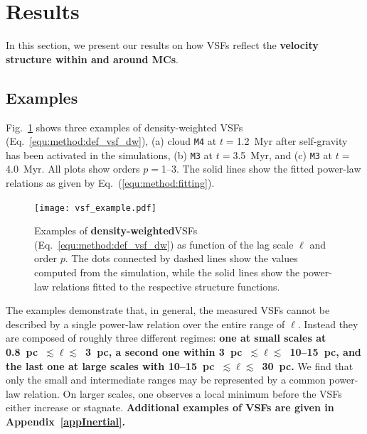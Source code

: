 \section{Results}\label{results}

In this section, we present our results on how VSFs reflect the \textbf{velocity structure within and around MCs}.

\subsection{Examples}\label{results:example}

Fig.~\ref{pic:results:vsf_example} shows three examples of density-weighted VSFs (Eq.~\ref{equ:method:def_vsf_dw}), (a) cloud \texttt{M4} at $t=$1.2~Myr after self-gravity has been activated in the simulations, (b) \texttt{M3} at $t=$3.5~Myr, and (c) \texttt{M3} at $t=$4.0~Myr.
All plots show orders $p=$1--3.
The solid lines show the fitted power-law relations as given by Eq.~(\ref{equ:method:fitting}).

\begin{figure}[!htb]
	\centering
	\texttt{[image: vsf\_example.pdf]}
	\caption{Examples of \textbf{density-weighted}VSFs (Eq.~\ref{equ:method:def_vsf_dw})  as function of the lag scale $\ell$ and order $p$. 
		The dots connected by dashed lines show the values computed from the simulation, while
		the solid lines show the power-law relations fitted to the respective structure functions.
	}
	\label{pic:results:vsf_example}
\end{figure}

The examples demonstrate that, in general, the measured VSFs cannot be described by a single power-law relation over the entire range of $\ell$.
Instead they are composed of roughly three different regimes: 
\textbf{
one at small scales at 0.8~pc~$\lesssim \ell \lesssim$~3~pc, a second one within 3~pc~$\lesssim \ell \lesssim$~10--15~pc, and the last one at large scales with 10--15~pc~$\lesssim \ell \lesssim$~30~pc. 
}
We find that only the small and intermediate ranges may be represented by a common power-law relation.
On larger scales, one observes a local minimum before the VSFs either increase or stagnate.
\textbf{Additional examples of VSFs are given in Appendix~\ref{appInertial}.}

